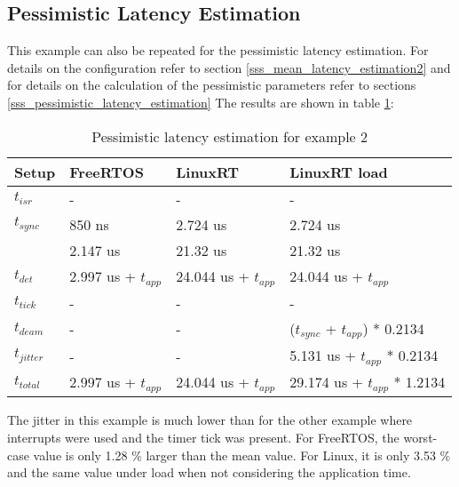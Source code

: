 \subsection{Pessimistic Latency Estimation}\label{sss_pessimistic_latency_estimation2}
This example can also be repeated for the pessimistic latency estimation.
For details on the configuration refer to section \ref{sss_mean_latency_estimation2} and for details on the calculation of the pessimistic parameters refer to sections \ref{sss_pessimistic_latency_estimation}
The results are shown in table \ref{tab_example2_pessimistic}:
\begin{table}[htbp]
	\centering
		\begin{tabular}{|l|l|l|l|}
			\hline
				Setup					& FreeRTOS 								& LinuxRT 							& LinuxRT load  \\
				\hline 
			 	$t_{isr}$ 		& -				 								& -											& -							\\
			  $t_{sync}$		& 850 ns			  	  			& 2.724 us 				 			& 2.724 us			\\
			  							&	2.147 us								& 21.32 us							& 21.32 us			\\
			  \hline 
			  $t_{det}$			& 2.997 us + $t_{app}$		& 24.044 us + $t_{app}$	& 24.044 us	+ $t_{app}$		\\ 
			  \hline
			  \hline
			  $t_{tick}$		& -												& -					 					  & -													\\
			  $t_{deam}$		& -				  							& - 				 						& ($t_{sync}$ + $t_{app}$) * 0.2134 \\ 
				\hline 
			  $t_{jitter}$	& -				  							& -										  & 5.131 us	+ $t_{app}$ * 0.2134 \\ 
			  \hline
			  \hline 
			  $t_{total}$		& 2.997 us + $t_{app}$	 & 24.044 us + $t_{app}$  &	29.174 us + $t_{app}$ * 1.2134 	\\ 
			\hline
		\end{tabular}
	\caption{Pessimistic latency estimation for example 2}
	\label{tab_example2_pessimistic}
\end{table}
The jitter in this example is much lower than for the other example where interrupts were used and the timer tick was present.
For FreeRTOS, the worst-case value is only 1.28 \% larger than the mean value.
For Linux, it is only 3.53 \% and the same value under load when not considering the application time. 

